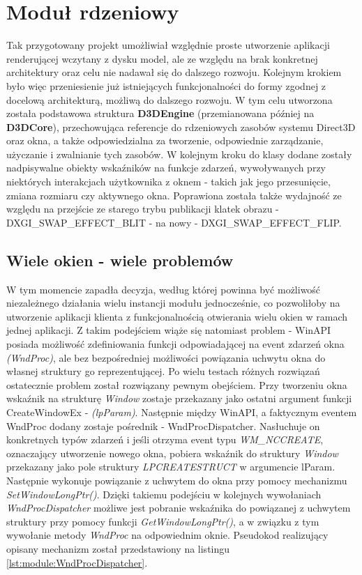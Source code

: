 \section{Moduł rdzeniowy}
Tak przygotowany projekt umożliwiał względnie proste utworzenie aplikacji renderującej wczytany z dysku model, ale ze względu na brak konkretnej architektury oraz celu nie nadawał się do dalszego rozwoju. Kolejnym krokiem było więc przeniesienie już istniejących funkcjonalności do formy zgodnej z docelową architekturą, możliwą do dalszego rozwoju. W tym celu utworzona została podstawowa struktura \textbf{D3DEngine} (przemianowana później na \textbf{D3DCore}), przechowująca referencje do rdzeniowych zasobów systemu Direct3D oraz okna, a także odpowiedzialna za tworzenie, odpowiednie zarządzanie, użyczanie i zwalnianie tych zasobów. W kolejnym kroku do klasy dodane zostały nadpisywalne obiekty wskaźników na funkcje zdarzeń, wywoływanych przy niektórych interakcjach użytkownika z oknem - takich jak jego przesunięcie, zmiana rozmiaru czy aktywnego okna. Poprawiona została także wydajność ze względu na przejście ze starego trybu publikacji klatek obrazu - DXGI\_SWAP\_EFFECT\_BLIT - na nowy - DXGI\_SWAP\_EFFECT\_FLIP. 

\subsection{Wiele okien - wiele problemów}
W tym momencie zapadła decyzja, według której powinna być możliwość niezależnego działania wielu instancji modułu jednocześnie, co pozwoliłoby na utworzenie aplikacji klienta z funkcjonalnością otwierania wielu okien w ramach jednej aplikacji. Z takim podejściem wiąże się natomiast problem - WinAPI posiada możliwość zdefiniowania funkcji odpowiadającej na event zdarzeń okna \textit{(WndProc)}, ale bez bezpośredniej możliwości powiązania uchwytu okna do własnej struktury go reprezentującej. Po wielu testach różnych rozwiązań ostatecznie problem został rozwiązany pewnym obejściem. Przy tworzeniu okna wskaźnik na strukturę \textit{Window} zostaje przekazany jako ostatni argument funkcji CreateWindowEx - \textit{(lpParam)}. Następnie między WinAPI, a faktycznym eventem WndProc dodany zostaje pośrednik - WndProcDispatcher. Nasłuchuje on konkretnych typów zdarzeń i jeśli otrzyma event typu \textit{WM\_NCCREATE}, oznaczający utworzenie nowego okna, pobiera wskaźnik do struktury \textit{Window} przekazany jako pole struktury \textit{LPCREATESTRUCT} w argumencie lParam. Następnie wykonuje powiązanie z uchwytem do okna przy pomocy mechanizmu \textit{SetWindowLongPtr()}. Dzięki takiemu podejściu w kolejnych wywołaniach \textit{WndProcDispatcher} możliwe jest pobranie wskaźnika do powiązanej z uchwytem struktury przy pomocy funkcji \textit{GetWindowLongPtr()}, a w związku z tym wywołanie metody \textit{WndProc} na odpowiednim oknie. Pseudokod realizujący opisany mechanizm został przedstawiony na listingu \ref{lst:module:WndProcDispatcher}.

